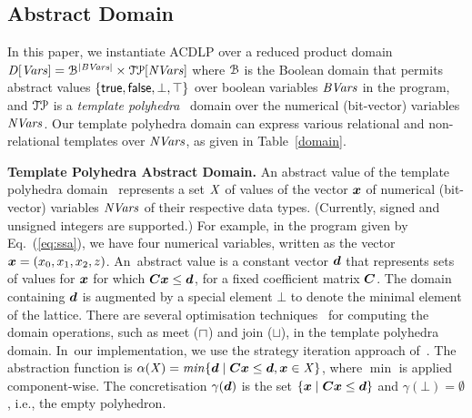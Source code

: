 \subsection{Abstract Domain}
In this paper, we instantiate ACDLP over a reduced product domain~\cite{CC79}
$\mathit{D}[\mathit{Vars}]=\mathcal{B}^{|\mathit{BVars}|}\times\mathcal{TP}[\mathit{NVars}]$ where
$\mathcal{B}$ is the Boolean domain that permits abstract values
$\{\mathsf{true},\mathsf{false},\bot,\top\}$ over boolean variables $\mathit{BVars}$ in the
program, and $\mathcal{TP}$ is a \textit{template polyhedra}~\cite{vmcai05}
domain over the numerical (bit-vector) variables $\mathit{NVars}$.  Our template
polyhedra domain can express various relational and non-relational templates
over $\mathit{NVars}$, as given in Table~\ref{domain}.

\bigskip

\noindent\textbf{Template Polyhedra Abstract Domain.}
An abstract value of the template polyhedra domain~\cite{vmcai05}
represents a set $\mathit{X}$ of values of the vector ${\boldsymbol {x}}$ 
of numerical (bit-vector) variables $\mathit{NVars}$ of their respective
data types. (Currently, signed and unsigned integers are supported.)
For example, in the program given by Eq.~(\ref{eq:ssa}), we have four 
numerical variables, written as the vector ${\boldsymbol {x}} = (x_0,x_1,x_2,z)$.  
An~abstract value is a constant vector ${\boldsymbol {d}}$ that represents 
sets of values for ${\boldsymbol {x}}$ for which 
${\boldsymbol C}{\boldsymbol {x}}\leq{\boldsymbol {d}}$, for a fixed coefficient 
matrix ${\boldsymbol C}$.  The domain containing ${\boldsymbol {d}}$ is augmented 
by a special element $\bot$ to denote the minimal element of the lattice.  
%
There are several optimisation techniques~\cite{vmcai05} for computing the domain operations, 
such as meet ($\sqcap$) and join ($\sqcup$), in the template polyhedra domain.  
In~our implementation, we use the strategy iteration approach of~\cite{BJKS15}.
%
The abstraction function is $\alpha(\mathit{X}) = \mathit{min} \{{\boldsymbol {d}}\mid
{\boldsymbol C}{\boldsymbol {x}}\leq{\boldsymbol {d}}, {\boldsymbol {x}}\in \mathit{X}\}$, where 
$\min$ is applied component-wise.  The concretisation $\gamma({\boldsymbol {d}})$ is the set $\{{\boldsymbol {x}}\mid
{\boldsymbol C}{\boldsymbol {x}}\leq{\boldsymbol {d}}\}$ and $\gamma(\bot)=\emptyset$,
i.e., the empty polyhedron.

